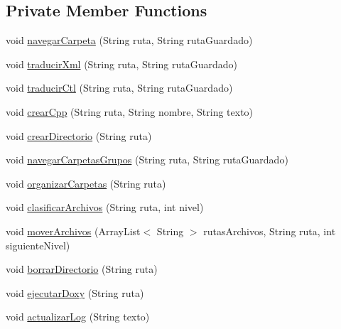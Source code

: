 \subsection*{Private Member Functions}
\begin{DoxyCompactItemize}
\item 
void \mbox{\hyperlink{classactualizadordoxy_1_1_actualizador_doxy_af4668210418bc7f9f1d6b8786891678b}{navegar\+Carpeta}} (String ruta, String ruta\+Guardado)
\item 
void \mbox{\hyperlink{classactualizadordoxy_1_1_actualizador_doxy_a598c7f1543ae3cf3f24b3fabcf2ad204}{traducir\+Xml}} (String ruta, String ruta\+Guardado)
\item 
void \mbox{\hyperlink{classactualizadordoxy_1_1_actualizador_doxy_a0a365e6e69bfc823f8ac8eea0e348c04}{traducir\+Ctl}} (String ruta, String ruta\+Guardado)
\item 
void \mbox{\hyperlink{classactualizadordoxy_1_1_actualizador_doxy_aebb9505e0384909ac6e2e677f400eaec}{crear\+Cpp}} (String ruta, String nombre, String texto)
\item 
void \mbox{\hyperlink{classactualizadordoxy_1_1_actualizador_doxy_a7d8af20d53904ac818f04740c5264d9f}{crear\+Directorio}} (String ruta)
\item 
void \mbox{\hyperlink{classactualizadordoxy_1_1_actualizador_doxy_a483f64d7ea713784694962feed55f4f4}{navegar\+Carpetas\+Grupos}} (String ruta, String ruta\+Guardado)
\item 
void \mbox{\hyperlink{classactualizadordoxy_1_1_actualizador_doxy_ada45f34eba1b90fde37a09726ff2de59}{organizar\+Carpetas}} (String ruta)
\item 
void \mbox{\hyperlink{classactualizadordoxy_1_1_actualizador_doxy_a552da974148de3397521e9ca911e5568}{clasificar\+Archivos}} (String ruta, int nivel)
\item 
void \mbox{\hyperlink{classactualizadordoxy_1_1_actualizador_doxy_acf04af5d317d03499a2a05a3091592e5}{mover\+Archivos}} (Array\+List$<$ String $>$ rutas\+Archivos, String ruta, int siguiente\+Nivel)
\item 
void \mbox{\hyperlink{classactualizadordoxy_1_1_actualizador_doxy_a19ee42edb9fe87c54d8581bc1a37ed77}{borrar\+Directorio}} (String ruta)
\item 
void \mbox{\hyperlink{classactualizadordoxy_1_1_actualizador_doxy_ae7d94f01945c2c9c2d1fab249652cc70}{ejecutar\+Doxy}} (String ruta)
\item 
void \mbox{\hyperlink{classactualizadordoxy_1_1_actualizador_doxy_a1ad41046efbaaf40a60b34da347f9090}{actualizar\+Log}} (String texto)
\end{DoxyCompactItemize}
